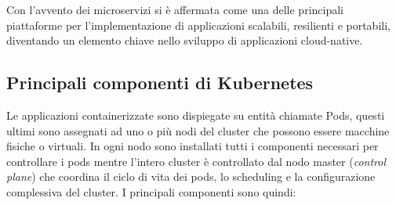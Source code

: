 \documentclass[12pt,a4paper,openright,twoside]{book}
\begin{document}
Con l'avvento dei microservizi si è affermata come una delle principali piattaforme per l'implementazione di applicazioni scalabili, resilienti e portabili, diventando un elemento chiave nello sviluppo di applicazioni cloud-native.
\subsection{Principali componenti di Kubernetes}
Le applicazioni containerizzate sono dispiegate su entità chiamate Pods, questi ultimi sono assegnati ad uno o più nodi del cluster che possono essere macchine fisiche o virtuali.
In ogni nodo sono installati tutti i componenti necessari per controllare i pods mentre l'intero cluster è controllato dal nodo master (\textit{control plane}) che coordina il ciclo di vita dei pods, lo scheduling e la configurazione complessiva del cluster.
I principali componenti sono quindi:
\end{document}
